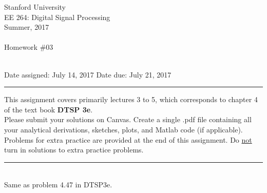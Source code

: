 \documentclass[12pt]{report}
\begin{document}
\thispagestyle{empty}
\begin{centering}
	{\large Stanford University}\\
	{\large EE 264: Digital Signal Processing}\\
	{\large Summer, 2017} \\
	\mbox{}\\
	{\large Homework \#03}\\
	\mbox{}\\
\end{centering}
\noindent Date assigned:  July 14, 2017 \hfill
Date due: July 21, 2017\\
\noindent \rule{6.5 in}{0.5pt}
  This assignment covers primarily lectures 3 to 5, which corresponds to chapter 4 of the text book {\bf DTSP 3e}. \\
  Please submit your solutions on Canvas. Create a single .pdf file containing all your analytical derivations, sketches, plots, and Matlab code (if applicable). \\
  Problems for extra practice are provided at the end of this assignment. Do \underline{not} turn in solutions to extra practice problems.

\noindent
\rule{6.5 in}{0.5pt}
\mbox{}\\


  Same as problem 4.47 in DTSP3e.
\end{document}
